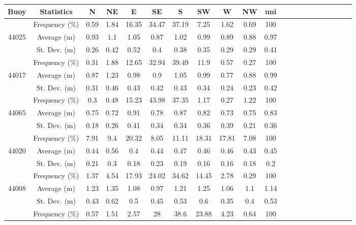 \begin{table}[H]
\begin{tabular*}{\textwidth}{c@{\hskip 0.07in}cccccccccc @{\extracolsep{\fill}} cccccccccc}
\toprule
    \textbf{Buoy} & \textbf{Statistics} &  \textbf{N} & \textbf{NE}  & \textbf{E} & \textbf{SE} &  \textbf{S} &  \textbf{SW}  &  \textbf{W}  &  \textbf{NW}  & \textbf{uni}  \\ \midrule
    ~     & Frequency (\%)  & 0.59 & 1.84 & 16.35 & 34.47 & 37.19 & 7.25  & 1.62  & 0.69 & 100  \\
    44025 & Average (m)   & 0.93 & 1.1  & 1.05  & 0.87  & 1.02  & 0.99  & 0.89  & 0.88 & 0.97 \\
    ~     & St. Dev. (m)  & 0.26 & 0.42 & 0.52  & 0.4   & 0.38  & 0.35  & 0.29  & 0.29 & 0.41 \\ \midrule
    ~     & Frequency (\%)  & 0.31 & 1.88 & 12.65 & 32.94 & 39.49 & 11.9  & 0.57  & 0.27 & 100  \\
    44017 & Average (m)   & 0.87 & 1.23 & 0.98  & 0.9   & 1.05  & 0.99  & 0.77  & 0.88 & 0.99 \\
    ~     & St. Dev. (m)  & 0.31 & 0.46 & 0.43  & 0.42  & 0.43  & 0.34  & 0.24  & 0.23 & 0.42 \\ \midrule
    ~     & Frequency (\%)  & 0.3  & 0.48 & 15.23 & 43.98 & 37.35 & 1.17  & 0.27  & 1.22 & 100  \\
    44065 & Average (m)   & 0.75 & 0.72 & 0.91  & 0.78  & 0.87  & 0.82  & 0.73  & 0.75 & 0.83 \\
    ~     & St. Dev. (m)  & 0.18 & 0.26 & 0.41  & 0.34  & 0.34  & 0.36  & 0.39  & 0.21 & 0.36 \\ \midrule
    ~     & Frequency (\%)  & 7.91 & 9.4  & 20.32 & 8.05  & 11.11 & 18.31 & 17.81 & 7.08 & 100  \\
    44020 & Average (m)   & 0.44 & 0.56 & 0.4   & 0.44  & 0.47  & 0.46  & 0.46  & 0.43 & 0.45 \\
    ~     & St. Dev. (m)  & 0.21 & 0.3  & 0.18  & 0.23  & 0.19  & 0.16  & 0.16  & 0.18 & 0.2  \\ \midrule
    ~     & Frequency (\%)  & 1.37 & 4.54 & 17.93 & 24.02 & 34.62 & 14.45 & 2.78  & 0.29 & 100  \\
    44008 & Average (m)   & 1.23 & 1.35 & 1.08  & 0.97  & 1.21  & 1.25  & 1.06  & 1.1  & 1.14 \\
    ~     & St. Dev. (m)  & 0.43 & 0.62 & 0.5   & 0.45  & 0.53  & 0.6   & 0.35  & 0.4  & 0.53 \\ \midrule
    ~     & Frequency (\%)  & 0.57 & 1.51 & 2.57  & 28    & 38.6  & 23.88 & 4.23  & 0.64 & 100  \\

\end{tabular*}
\end{table}
